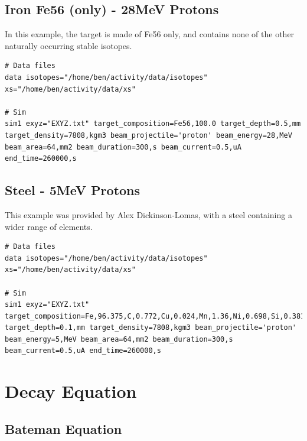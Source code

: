 \documentclass[12pt,twoside]{manual}
\begin{document}
\section{Iron Fe56 (only) - 28MeV Protons}

In this example, the target is made of Fe56 only, and contains none of the other naturally occurring stable isotopes.

\begin{lstlisting}[style=inputfile, caption={}]
# Data files
data isotopes="/home/ben/activity/data/isotopes" xs="/home/ben/activity/data/xs"

# Sim
sim1 exyz="EXYZ.txt" target_composition=Fe56,100.0 target_depth=0.5,mm target_density=7808,kgm3 beam_projectile='proton' beam_energy=28,MeV beam_area=64,mm2 beam_duration=300,s beam_current=0.5,uA end_time=260000,s
\end{lstlisting}



\section{Steel - 5MeV Protons}

This example was provided by Alex Dickinson-Lomas, with a steel containing a wider range of elements.

\begin{lstlisting}[style=inputfile, caption={}]
# Data files
data isotopes="/home/ben/activity/data/isotopes" xs="/home/ben/activity/data/xs"

# Sim
sim1 exyz="EXYZ.txt" target_composition=Fe,96.375,C,0.772,Cu,0.024,Mn,1.36,Ni,0.698,Si,0.381,Cr,0.092,V,0.008,P,0.009,Si,0.003,Mo,0.278 target_depth=0.1,mm target_density=7808,kgm3 beam_projectile='proton' beam_energy=5,MeV beam_area=64,mm2 beam_duration=300,s beam_current=0.5,uA end_time=260000,s
\end{lstlisting}











\chapter{Decay Equation}

\section{Bateman Equation}
\end{document}
